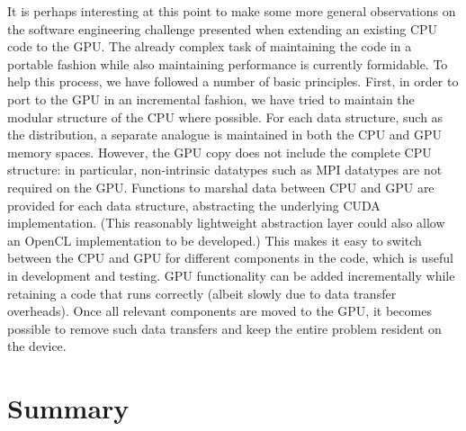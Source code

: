 It is perhaps interesting at this point to make some more general
observations on the software engineering challenge presented when
extending an existing CPU code to the GPU. The already complex
task of maintaining the code in a portable fashion while also
maintaining performance is currently formidable. To help this process,
we have followed a number of basic principles. First,
in order to port to the GPU in an incremental fashion,
we have tried to maintain the modular structure of the CPU where
possible. For each data structure, such as the distribution, a separate
analogue is maintained in both the CPU and GPU memory spaces. However,
the GPU copy does not include the complete CPU structure: in
particular, non-intrinsic datatypes such as MPI datatypes are not
required on the GPU. Functions to marshal data between CPU and GPU
are provided for each data structure, abstracting the underlying
CUDA implementation. (This reasonably lightweight abstraction layer
could also allow an OpenCL implementation to be developed.) 
This makes it easy to switch between the CPU and GPU for different
components in the code, which is useful in development
and testing. GPU functionality can be added incrementally while
retaining a code that runs correctly (albeit slowly due to data
transfer overheads).  Once all relevant components are moved to
the GPU, it becomes possible to remove such data transfers and
keep the entire problem resident on the device.





\section{Summary}


